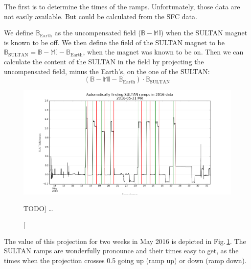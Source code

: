 The first is to determine the times of the ramps. Unfortunately, those data are not easily available. But could be calculated from the SFC data.

We define $\mathbb{B}_\text{Earth}$ as the uncompensated field ($\mathbb{B} - \mathbb{M} \mathbb{I}$) when the SULTAN magnet is known to be off. We then define the field of the SULTAN magnet to be $\mathbb{B}_\text{SULTAN} = \mathbb{B} - \mathbb{M} \mathbb{I} - \mathbb{B}_\text{Earth}$, when the magnet was known to be on. Then we can calculate the content of the SULTAN in the field by projecting the uncompensated field, minus the Earth's, on the one of the SULTAN\@:
\begin{equation}
  \left( \mathbb{B} - \mathbb{M} \mathbb{I} - \mathbb{B}_\text{Earth} \right) \cdot \mathbb{B}_\text{SULTAN}  
\end{equation}

\begin{figure}
  \centering
  \includegraphics[width=.7\linewidth]{gfx/nEDM_SFC/finding_SULTAN_ramps.png}
  \caption
  [TODO]
  {\ldots}
  \label{fig:finding_SULTAN_ramps}
\end{figure}

The value of this projection for two weeks in May 2016 is depicted in Fig.\,\ref{fig:finding_SULTAN_ramps}. The SULTAN ramps are wonderfully pronounce and their times easy to get, as the times when the projection crosses 0.5 going up (ramp up) or down (ramp down).

